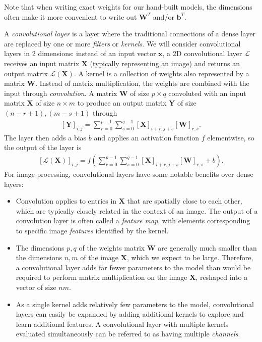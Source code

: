 \documentclass{somasmsc}
\begin{document}
Note that when writing exact weights for our hand-built models, the dimensions often make it more convenient to write out $\mathbf{W}^T$ and/or $\pmb{b}^T$.

A \textit{convolutional layer} is a layer where the traditional connections of a dense layer are replaced by one or more \textit{filters} or \textit{kernels}. We will consider convolutional layers in 2 dimensions: instead of an input vector $\pmb{x}$, a 2D convolutional layer $\mathcal{L}$ receives an input matrix $\mathbf{X}$ (typically representing an image) and returns an output matrix $\mathcal{L}\left(\mathbf{X}\right)$. A kernel is a collection of weights also represented by a matrix $\mathbf{W}$. Instead of matrix multiplication, the weights are combined with the input through \textit{convolution}. A matrix $\mathbf{W}$ of size $p \times q$ convoluted with an input matrix $\mathbf{X}$ of size $n \times m$ to produce an output matrix $\mathbf{Y}$ of size $\left(n-r+1\right),\left(m-s+1\right)$ through
\begin{align*}
\left[\mathbf{Y}\right]_{i,j} = \sum_{r=0}^{p-1} \sum_{s=0}^{q-1} \left[\mathbf{X}\right]_{i+r, j+s} \left[\mathbf{W}\right]_{r,s}.
\end{align*}
The layer then adds a bias $b$ and applies an activation function $f$ elementwise, so the output of the layer is
\begin{align*}
\left[\mathcal{L}\left(\mathbf{X}\right)\right]_{i,j} = f\left(\sum_{r=0}^{p-1} \sum_{s=0}^{q-1} \left[\mathbf{X}\right]_{i+r, j+s} \left[\mathbf{W}\right]_{r,s} + b\right).
\end{align*}
For image processing, convolutional layers have some notable benefits over dense layers:
\begin{itemize}
    \item Convolution applies to entries in $\mathbf{X}$ that are spatially close to each other, which are typically closely related in the context of an image. The output of a convolution layer is often called a \textit{feature map}, with elements corresponding to specific image \textit{features} identified by the kernel.
    \item The dimensions $p,q$ of the weights matrix $\mathbf{W}$ are generally much smaller than the dimensions $n, m$ of the image $\mathbf{X}$, which we expect to be large. Therefore, a convolutional layer adds far fewer parameters to the model than would be required to perform matrix multiplication on the image $\mathbf{X}$, reshaped into a vector of size $nm$.
    \item As a single kernel adds relatively few parameters to the model, convolutional layers can easily be expanded by adding additional kernels to explore and learn additional features. A convolutional layer with multiple kernels evaluated simultaneously can be referred to as having multiple \textit{channels}.
\end{itemize}
\end{document}
